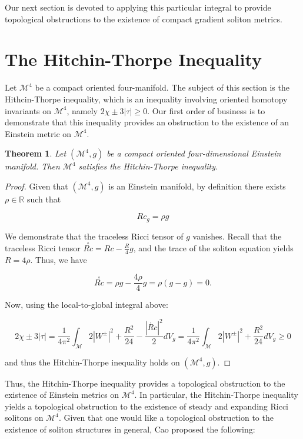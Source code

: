\documentclass[openany, amssymb, psamsfonts]{amsart}
\newtheorem{thm}{Theorem}[section]
\theoremstyle{definition}
\numberwithin{equation}{section}
\begin{document}
Our next section is devoted to applying this particular integral to provide topological obstructions to the existence of compact gradient soliton metrics. 

\section{The Hitchin-Thorpe Inequality}

    Let $\mathcal{M}^4$ be a compact oriented four-manifold. The subject of this section is the Hithcin-Thorpe inequality, which is an inequality involving oriented homotopy invariants on $\mathcal{M}^4$, namely $2\chi \pm 3|\tau| \geq 0$. Our first order of business is to demonstrate that this inequality provides an obstruction to the existence of an Einstein metric on $\mathcal{M}^4$. 

    \begin{thm}
    Let $(\mathcal{M}^4, g)$ be a compact oriented four-dimensional Einstein manifold. Then $\mathcal{M}^4$ satisfies the Hitchin-Thorpe inequality. 
    \end{thm}

    \begin{proof}

    Given that $(\mathcal{M}^4, g)$ is an Einstein manifold, by definition there exists $\rho \in \mathbb{R}$ such that 

    $$Rc_g = \rho g$$

    We demonstrate that the traceless Ricci tensor of $g$ vanishes. Recall that the traceless Ricci tensor $\overset{\circ}{Rc} = Rc - \frac{R}{4}g$, and the trace of the soliton equation yields $R = 4\rho$. Thus, we have

    $$\overset{\circ}{Rc} = \rho g - \frac{4\rho}{4}g = \rho(g - g) = 0.$$

    Now, using the local-to-global integral above:

    $$2\chi \pm 3|\tau| = \frac{1}{4\pi^2}\int_{\mathcal{M}} 2|W^\pm|^2 + \frac{R^2}{24} - \frac{|\mathring{Rc}|^2}{2}dV_g = \frac{1}{4\pi^2}\int_{\mathcal{M}} 2|W^\pm|^2 + \frac{R^2}{24}dV_g \geq 0$$

    and thus the Hitchin-Thorpe inequality holds on $(\mathcal{M}^4, g)$.

    \end{proof}

    Thus, the Hitchin-Thorpe inequality provides a topological obstruction to the existence of Einstein metrics on $\mathcal{M}^4$. In particular, the Hitchin-Thorpe inequality yields a topological obstruction to the existence of steady and expanding Ricci solitons on $\mathcal{M}^4$. Given that one would like a topological obstruction to the existence of soliton structures in general, Cao \cite{caoThree} proposed the following:
\end{document}
